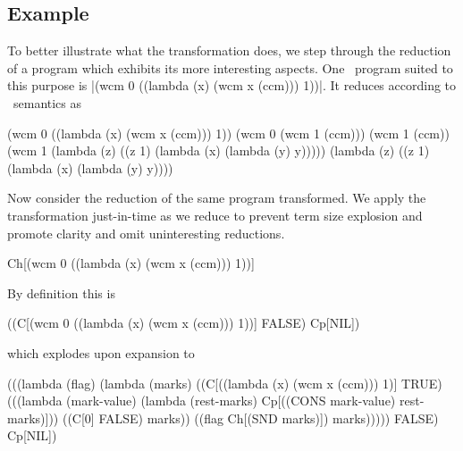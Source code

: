 \subsection{Example}

To better illustrate what the transformation does, we step through the reduction of a program which exhibits its more interesting aspects. One \cm\ program suited to this purpose is \scheme|(wcm 0 ((lambda (x) (wcm x (ccm))) 1))|. It reduces according to \cm\ semantics as
\begin{schemeblock}
\begin{schemedisplay}
(wcm 0 ((lambda (x) (wcm x (ccm))) 1))
(wcm 0 (wcm 1 (ccm)))
(wcm 1 (ccm))
(wcm 1 (lambda (z) ((z 1) (lambda (x) (lambda (y) y)))))
(lambda (z) ((z 1) (lambda (x) (lambda (y) y))))
\end{schemedisplay}
\end{schemeblock}

Now consider the reduction of the same program transformed. We apply the transformation just-in-time as we reduce to prevent term size explosion and promote clarity and omit uninteresting reductions.
\begin{schemeblock}
\begin{schemedisplay}
Ch[(wcm 0 ((lambda (x) (wcm x (ccm))) 1))]
\end{schemedisplay}
\end{schemeblock}

By definition this is
\begin{schemeblock}
\begin{schemedisplay}
((C[(wcm 0 ((lambda (x) (wcm x (ccm))) 1))] FALSE) Cp[NIL])
\end{schemedisplay}
\end{schemeblock}
\noindent
which explodes upon expansion to
\begin{schemeblock}
\begin{schemedisplay}
(((lambda (flag)
    (lambda (marks)
      ((C[((lambda (x) (wcm x (ccm))) 1)] TRUE)
       (((lambda (mark-value) (lambda (rest-marks) Cp[((CONS mark-value) rest-marks)]))
         ((C[0] FALSE) marks)) ((flag Ch[(SND marks)]) marks)))))
  FALSE) Cp[NIL])
\end{schemedisplay}
\end{schemeblock}

